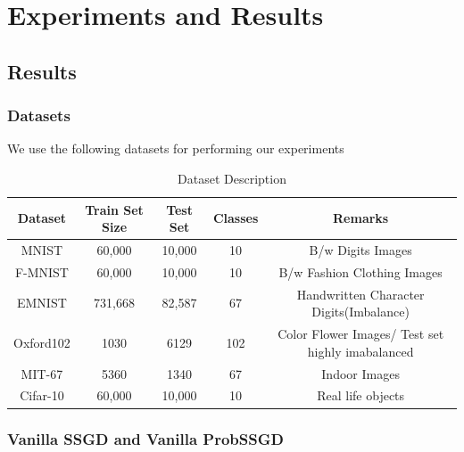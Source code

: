 \documentclass[a4paper,twoside]{iiththesis}
\theoremstyle{definition}
\theoremstyle{definition}
\theoremstyle{remark}
\begin{document}
\part{Experiments and Results}

\chapter{Results }

\section{Datasets}
We use the following datasets for performing our experiments
\begin{table}[!htb]\label{Dataset}
	\renewcommand{\arraystretch}{1.5}
	\centering
	\begin{tabular}{|c|c|c|c|c|} \hline
		\textbf{Dataset} & \textbf{Train Set Size} & \textbf{Test Set} & \textbf{Classes} & \textbf{Remarks}\\ \hline
		MNIST & 60,000  &  10,000 & 10 & B/w Digits Images\\ \hline
		F-MNIST & 60,000  &  10,000 & 10& B/w Fashion Clothing Images \\ \hline
		EMNIST & 731,668  &  82,587 & 67 & Handwritten Character Digits(Imbalance)\\ \hline
		Oxford102 & 1030 &  6129 & 102 & Color Flower Images/ Test set highly imabalanced\\ \hline
		MIT-67 & 5360 & 1340 & 67 & Indoor Images\\ \hline
		Cifar-10 & 60,000 & 10,000 & 10& Real life objects\\ \hline
	\end{tabular}
    \caption{Dataset Description}
\end{table}

\section{Vanilla SSGD and Vanilla ProbSSGD}
\end{document}
